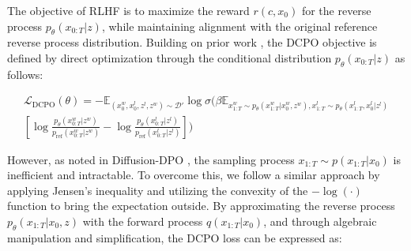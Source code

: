 The objective of RLHF is to maximize the reward \( r(c, x_0) \) for the reverse process \( p_{\theta}(x_{0:T}|z) \), while maintaining alignment with the original reference reverse process distribution. 
Building on prior work \citep{wallace2024diffusion}, the DCPO objective is defined by direct optimization through the conditional distribution \( p_{\theta}(x_{0:T}|z) \) as follows:

\begin{equation}
\begin{split}
    \mathcal{L}_{\text{DCPO}}(\theta) = -\mathit{\mathbb{E}}_{(x^{w}_0, x^{l}_0, z^l, z^w) \sim \mathcal{D'}} \log \sigma( 
    \beta \mathit{\mathbb{E}}_{x^{w}_{1:T}\sim p_\theta(x^{w}_{1:T}|x^{w}_0, z^w),x^{l}_{1:T} \sim p_\theta (x^{l}_{1:T}, x^{l}_0|z^l)} \\
    [\log \frac{p_{\theta} (x^{w}_{0:T}|z^w)}{p_{\text{ref}}(x^{w}_{0:T}|z^w)} - \log \frac{p_\theta (x^{l}_{0:T}|z^l)}{p_{\text{ref}}(x^{l}_{0:T}|z^l)}])
\label{dcpo_loss}
\end{split}
\end{equation}

However, as noted in Diffusion-DPO \citep{wallace2024diffusion}, the sampling process \( x_{1:T} \sim p(x_{1:T} | x_0) \) is inefficient and intractable. To overcome this, we follow a similar approach by applying Jensen's inequality and utilizing the convexity of the \( -\log(\cdot) \) function to bring the expectation outside. By approximating the reverse process \( p_\theta(x_{1:T}|x_0, z) \) with the forward process \( q(x_{1:T}|x_0) \), and through algebraic manipulation and simplification, the DCPO loss can be expressed as:

